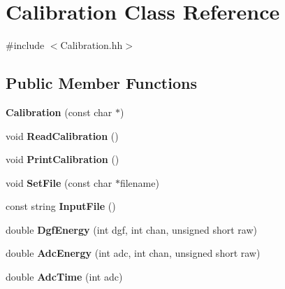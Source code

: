\hypertarget{class_calibration}{\section{Calibration Class Reference}
\label{class_calibration}
}


{\ttfamily \#include $<$Calibration.\-hh$>$}

\subsection*{Public Member Functions}
\begin{DoxyCompactItemize}
\item 
\hypertarget{class_calibration_a981f7a519754aecbdd3fbd837a5b5762}{{\bfseries Calibration} (const char $\ast$)}\label{class_calibration_a981f7a519754aecbdd3fbd837a5b5762}

\item 
\hypertarget{class_calibration_ad675a1c74ecd23e3af37fcffdeeed246}{void {\bfseries Read\-Calibration} ()}\label{class_calibration_ad675a1c74ecd23e3af37fcffdeeed246}

\item 
\hypertarget{class_calibration_af224d188d64080db8d14eb0ddbb909f7}{void {\bfseries Print\-Calibration} ()}\label{class_calibration_af224d188d64080db8d14eb0ddbb909f7}

\item 
\hypertarget{class_calibration_aec8340a8b2134c9cb51b685c928c4cee}{void {\bfseries Set\-File} (const char $\ast$filename)}\label{class_calibration_aec8340a8b2134c9cb51b685c928c4cee}

\item 
\hypertarget{class_calibration_a10affa676c2fb505d3075d23c3bf0157}{const string {\bfseries Input\-File} ()}\label{class_calibration_a10affa676c2fb505d3075d23c3bf0157}

\item 
\hypertarget{class_calibration_a0ea90a9b417ec5e50312b4bba2875f70}{double {\bfseries Dgf\-Energy} (int dgf, int chan, unsigned short raw)}\label{class_calibration_a0ea90a9b417ec5e50312b4bba2875f70}

\item 
\hypertarget{class_calibration_a07ba44fdc31250e347939588759d2796}{double {\bfseries Adc\-Energy} (int adc, int chan, unsigned short raw)}\label{class_calibration_a07ba44fdc31250e347939588759d2796}

\item 
\hypertarget{class_calibration_a860b3c2c4a2350009bbbf337aa56a212}{double {\bfseries Adc\-Time} (int adc)}\label{class_calibration_a860b3c2c4a2350009bbbf337aa56a212}


\end{DoxyCompactItemize}
